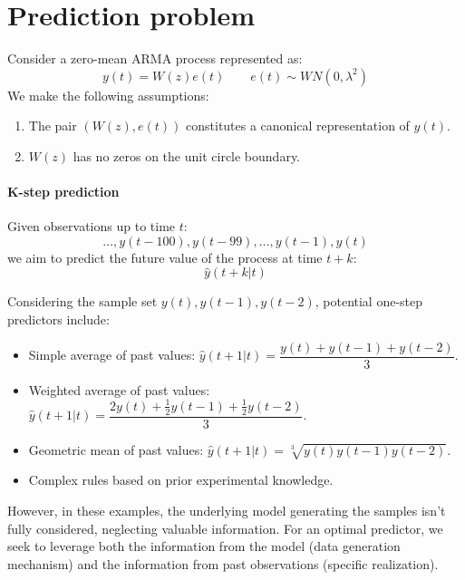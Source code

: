 \section{Prediction problem}

Consider a zero-mean ARMA process represented as:
\[y(t)=W(z)e(t) \qquad e(t)\sim WN(0,\lambda^2)\]
We make the following assumptions:
\begin{enumerate}
    \item The pair $\left( W(z),e(t) \right)$ constitutes a canonical representation of $y(t)$.
    \item $W(z)$ has no zeros on the unit circle boundary.
\end{enumerate}

\paragraph*{K-step prediction}
Given observations up to time $t$:
\[\dots,y(t-100),y(t-99),\dots,y(t-1),y(t)\]
we aim to predict the future value of the process at time $t+k$:
\[\hat{y}(t+k|t)\]

Considering the sample set $y(t), y(t-1),y(t-2)$, potential one-step predictors include:
\begin{itemize}
    \item Simple average of past values: $\hat{y}(t+1|t)=\dfrac{y(t)+y(t-1)+y(t-2)}{3}$.
    \item Weighted average of past values: $\hat{y}(t+1|t)=\dfrac{2y(t)+\frac{1}{2}y(t-1)+\frac{1}{2}y(t-2)}{3}$.
    \item Geometric mean of past values: $\hat{y}(t+1|t)=\sqrt[3]{y(t)y(t-1)y(t-2)}$.
    \item Complex rules based on prior experimental knowledge.
\end{itemize}
However, in these examples, the underlying model generating the samples isn't fully considered, neglecting valuable information.
For an optimal predictor, we seek to leverage both the information from the model (data generation mechanism) and the information from past observations (specific realization).